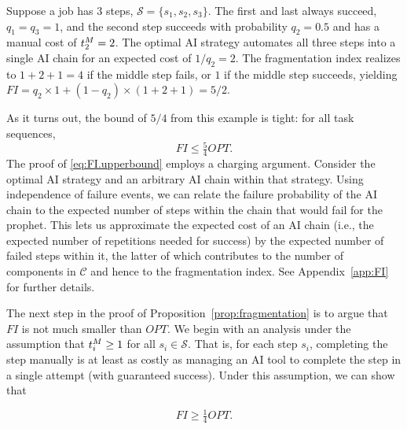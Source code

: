 \begin{example}
Suppose a job has 3 steps, $\mathcal{S} = \{s_1, s_2, s_3\}$. The first and last always succeed, $q_1 = q_3 = 1$, and the second step succeeds with probability $q_2 = 0.5$ and has a manual cost of $t^{M}_{2} = 2$.
The optimal AI strategy automates all three steps into a single AI chain for an expected cost of $1/q_2 = 2$. The fragmentation index realizes to $1+2+1=4$ if the middle step fails, or $1$ if the middle step succeeds, yielding $FI = q_2 \times 1 + (1-q_2) \times (1+2+1) = 5/2$.
\end{example}

As it turns out, the bound of $5/4$ from this example is tight: for all task sequences,
\begin{equation}
    \label{eq:FI.upperbound}
    FI \leq \tfrac{5}{4}OPT.
\end{equation}
The proof of \eqref{eq:FI.upperbound} employs a charging argument.  Consider the optimal AI strategy and an arbitrary AI chain within that strategy.  Using independence of failure events, we can relate the failure probability of the AI chain to the expected number of steps within the chain that would fail for the prophet.  This lets us approximate the expected cost of an AI chain (i.e., the expected number of repetitions needed for success) by the expected number of failed steps within it, the latter of which contributes to the number of components in $\mathcal{C}$ and hence to the fragmentation index. See Appendix~\ref{app:FI} for further details.

The next step in the proof of Proposition~\ref{prop:fragmentation} is to argue that $FI$ is not much smaller than $OPT$. We begin with an analysis under the assumption that $t^{M}_{i} \geq 1$ for all $s_i \in \mathcal{S}$. That is, for each step $s_i$, completing the step manually is at least as costly as managing an AI tool to complete the step in a single attempt (with guaranteed success).  Under this assumption, we can show that

\begin{equation}
\label{eq:FI.lowerbound.4}
    FI \geq \tfrac{1}{4}OPT.
\end{equation}


